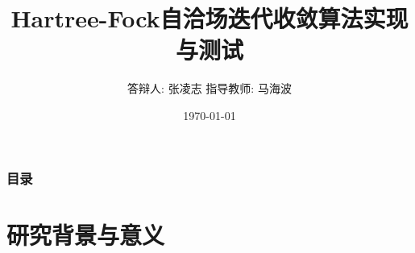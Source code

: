 \documentclass[10pt,aspectratio=43,mathserif,UTF8]{beamer}
\title{Hartree-Fock自洽场迭代收敛算法实现与测试
} %
\author{答辩人: 张凌志 \newline \newline 指导教师: 马海波} %
\institute %
{
南京大学化学化工学院 \\ %
\medskip
}
\date{\today} %
\begin{document}
\begin{frame}
\titlepage %
\end{frame}

\begin{frame}
\frametitle{目录} %
\tableofcontents %
\end{frame}


\section{研究背景与意义} %



\end{document}

